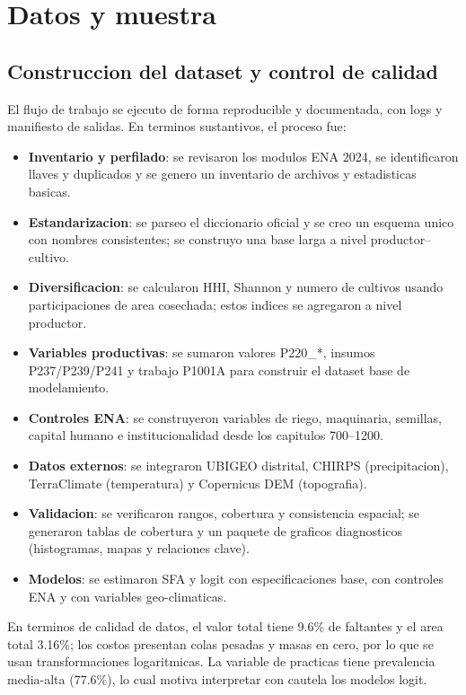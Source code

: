 \documentclass[10pt,a4paper]{article}
\begin{document}
\section{Datos y muestra}

\subsection{Construccion del dataset y control de calidad}
El flujo de trabajo se ejecuto de forma reproducible y documentada, con logs y manifiesto de salidas. En terminos sustantivos, el proceso fue:
\begin{itemize}
    \item \textbf{Inventario y perfilado}: se revisaron los modulos ENA 2024, se identificaron llaves y duplicados y se genero un inventario de archivos y estadisticas basicas.
    \item \textbf{Estandarizacion}: se parseo el diccionario oficial y se creo un esquema unico con nombres consistentes; se construyo una base larga a nivel productor--cultivo.
    \item \textbf{Diversificacion}: se calcularon HHI, Shannon y numero de cultivos usando participaciones de area cosechada; estos indices se agregaron a nivel productor.
    \item \textbf{Variables productivas}: se sumaron valores P220\_*, insumos P237/P239/P241 y trabajo P1001A para construir el dataset base de modelamiento.
    \item \textbf{Controles ENA}: se construyeron variables de riego, maquinaria, semillas, capital humano e institucionalidad desde los capitulos 700--1200.
    \item \textbf{Datos externos}: se integraron UBIGEO distrital, CHIRPS (precipitacion), TerraClimate (temperatura) y Copernicus DEM (topografia).
    \item \textbf{Validacion}: se verificaron rangos, cobertura y consistencia espacial; se generaron tablas de cobertura y un paquete de graficos diagnosticos (histogramas, mapas y relaciones clave).
    \item \textbf{Modelos}: se estimaron SFA y logit con especificaciones base, con controles ENA y con variables geo-climaticas.
\end{itemize}

En terminos de calidad de datos, el valor total tiene 9.6\% de faltantes y el area total 3.16\%; los costos presentan colas pesadas y masas en cero, por lo que se usan transformaciones logaritmicas. La variable de practicas tiene prevalencia media-alta (77.6\%), lo cual motiva interpretar con cautela los modelos logit.
\end{document}
